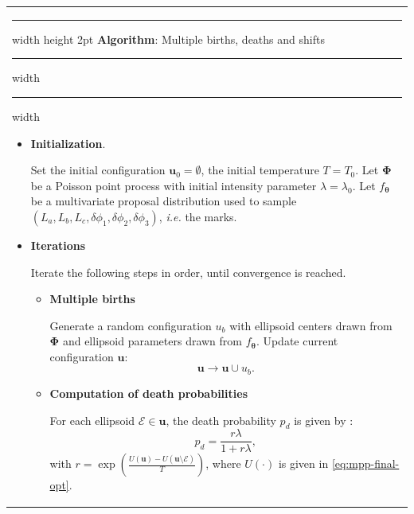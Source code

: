 \documentclass[journal]{IEEEtran}
\begin{document}
\begin{table}[!htb]
  \captionsetup{labelsep=none,labelformat=empty}
  \begin{center}
    \begin{tabular}{ m{9cm} }

      \hrule width \hsize height 2pt \vspace{0.3em}
      \textbf{Algorithm}: Multiple births, deaths and shifts
      \vspace{0.3em} \hrule width \hsize \kern 0.5mm \hrule width
      \hsize
      \vspace{0.5em}

      \begin{itemize}
        [leftmargin=*,noitemsep,topsep=3pt,parsep=0pt,partopsep=0pt]

      \item \textbf{Initialization}.

        Set the initial configuration $\mathbf{u}_0 = \emptyset$, the
        initial temperature $T = T_0$. Let $\mathbf{\Phi}$ be a
        Poisson point process with initial intensity parameter
        $\lambda = \lambda_0$. Let $f_{\boldsymbol{\theta}}$ be a
        multivariate proposal distribution used to sample
        $ \left( L_a, L_b, L_c, \delta{\phi_1}, \delta{\phi_2},
          \delta{\phi_3} \right)$, \textit{i.e.} the marks.

      \item \textbf{Iterations}

        Iterate the following steps in order, until convergence is
        reached.

        \begin{itemize}
          [leftmargin=*,noitemsep,topsep=3pt,parsep=0pt,partopsep=0pt]

        \item \textbf{Multiple births}

          Generate a random configuration $u_b$ with ellipsoid centers
          drawn from $\mathbf{\Phi}$ and ellipsoid parameters drawn
          from $f_{\boldsymbol{\theta}}$. Update current configuration
          $\mathbf{u}$:
          \begin{equation}
            \label{eq:mbds-update}
            \mathbf{u} \rightarrow \mathbf{u} \cup u_b.
          \end{equation}

        \item \textbf{Computation of death probabilities}

          For each ellipsoid $\mathcal{E} \in \mathbf{u}$, the death
          probability $p_d$ is given by \cite{descombes2009object}:
          \begin{equation}
            \label{eq:mbds-death-pr}
            p_d = \frac{r\lambda}{1 + r\lambda},
          \end{equation}
          with
          $r = \exp \left( \frac{ U(\mathbf{u}) - U(\mathbf{u}
              \setminus \mathcal{E}) }{T} \right)$, where $U(\cdot)$
          is given in \eqref{eq:mpp-final-opt}.


\end{itemize}
\end{itemize}
\end{tabular}
\end{center}
\end{table}
\end{document}

